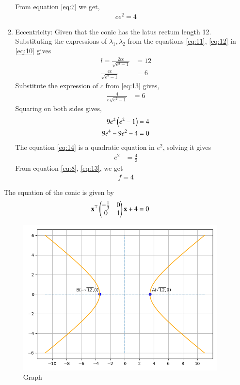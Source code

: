 \documentclass[journal,12pt,twocolumn]{IEEEtran}
\begin{document}
\begin{enumerate}
\begin{enumerate}
From equation \eqref{eq:7} we get,
\begin{align}
ce^2 = 4 \label{eq:13}
\end{align}
\item Eccentricity: Given that the conic has the latus rectum length 12. Substituting the expressions of $\lambda_1,\lambda_2$ from the equations \eqref{eq:11}, \eqref{eq:12} in \eqref{eq:10} gives
\begin{align}
l = \frac{2ce}{\sqrt{e^2-1}} &= 12\\
\frac{ce}{\sqrt{e^2-1}} &= 6
\end{align}
Substitute the expression of $c$ from \eqref{eq:13} gives,
\begin{align}
\frac{4}{e\sqrt{e^2-1}} &= 6
\end{align}
Squaring on both sides gives,
\begin{align}
9e^2\left(e^2-1\right) &= 4\\
9e^4-9e^2-4 &= 0
\label{eq:14}
\end{align}
The equation \eqref{eq:14} is a quadratic equation in $e^2$, solving it gives
\begin{align}
e^2 &= \frac{4}{3}
\end{align}
From equation \eqref{eq:8}, \eqref{eq:13}, we get
\begin{align}
f = 4
\end{align} 
\end{enumerate}
The equation of the conic is given by
\begin{align}
\mathbf{x}^\top\begin{pmatrix}-\frac{1}{3}&0\\0&1\end{pmatrix}\mathbf{x} +4 = 0
\end{align}
\begin{figure}[ht]
\centering
\includegraphics[width = \columnwidth]{"./figs/fig1.png"}
\caption{Graph}
\label{fig:1}
\end{figure}
\begin{table}[h]
\centering

\caption{}
\label{tab:1}
\end{table}
\end{enumerate}
\end{document}
